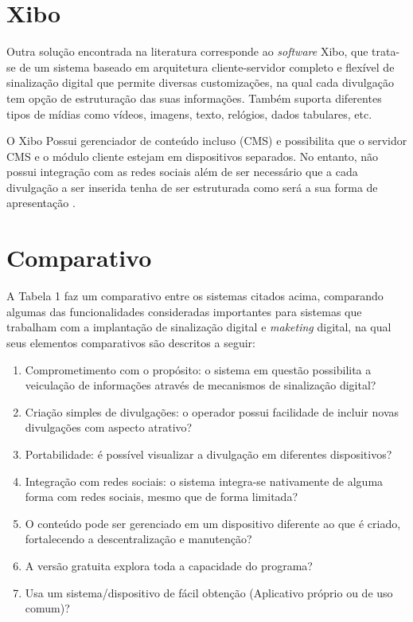 \section{Xibo}
Outra solução encontrada na literatura corresponde ao \textit{software} Xibo, que trata-se de um sistema baseado em arquitetura cliente-servidor completo e flexível de sinalização digital que permite diversas customizações, na qual cada divulgação tem opção de estruturação das suas informações. Também suporta diferentes tipos de mídias como vídeos, imagens, texto, relógios, dados tabulares, etc. 

O Xibo Possui gerenciador de conteúdo incluso (CMS) e possibilita que o servidor CMS e o módulo cliente estejam em dispositivos separados. No entanto, não possui integração com as redes sociais além de ser necessário que a cada divulgação a ser inserida tenha de ser estruturada como será a sua forma de apresentação \cite{xibo2017}.

\section{Comparativo}
A Tabela 1 faz um comparativo entre os sistemas citados acima, comparando algumas das funcionalidades consideradas importantes para sistemas que trabalham com a implantação de sinalização digital e \textit{maketing} digital, na qual seus elementos comparativos são descritos a seguir:
\begin{enumerate}[label=\Roman*)]
	\item Comprometimento com o propósito: o sistema em questão possibilita a veiculação de informações através de mecanismos de sinalização digital?
	\item Criação simples de divulgações: o operador possui facilidade de incluir novas divulgações com aspecto atrativo?
	\item Portabilidade: é possível visualizar a divulgação em diferentes dispositivos?
	\item Integração com redes sociais: o sistema integra-se nativamente de alguma forma com redes sociais, mesmo que de forma limitada?
	\item O conteúdo pode ser gerenciado em um dispositivo diferente ao que é criado, fortalecendo a descentralização e manutenção?
	\item A versão gratuita explora toda a capacidade do programa?
	\item Usa um sistema/dispositivo de fácil obtenção (Aplicativo próprio ou de uso comum)?
\end{enumerate}

